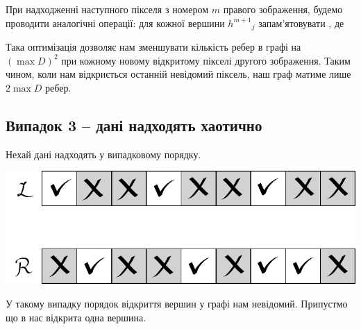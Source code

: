 \documentclass{ConfFTI}
\begin{document}
При надходженні наступного пікселя з номером $m$ правого зображення, будемо проводити аналогічні операції: для кожної вершини ${h^{m+1}}_j$ запам'ятовувати , де 

Така оптимізація дозволяє нам зменшувати кількість ребер в графі на  $(\max{D})^2$ при кожному новому відкритому пікселі другого зображення. Таким чином, коли нам відкриється останній невідомий піксель, наш граф матиме лише $2 \max{D}$ ребер.

\subsection{Випадок 3 -- дані надходять хаотично} 

Нехай дані надходять у випадковому порядку.

\begin{center}
\includegraphics[scale = 0.5]{chaotic.pdf}
\end{center}
	
У такому випадку порядок відкриття вершин у графі нам невідомий. Припустмо що в нас відкрита одна вершина.
	
\end{document}
